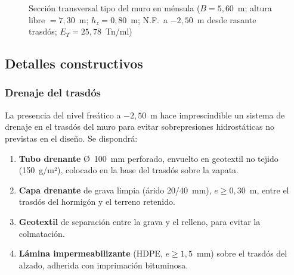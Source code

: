 \begin{figure}[H]
\caption{Sección transversal tipo del muro en ménsula
         ($B = 5{,}60$~m; altura libre $= 7{,}30$~m; $h_z = 0{,}80$~m;
          N.F.\ a $-2{,}50$~m desde rasante trasdós;
          $E_T = 25{,}78$~Tn/ml)}
\label{fig:muro_seccion}
\end{figure}

\subsection{Detalles constructivos}
\label{subsec:detalles_constructivos}

\subsubsection{Drenaje del trasdós}

La presencia del nivel freático a $-2{,}50$~m hace imprescindible un sistema
de drenaje en el trasdós del muro para evitar sobrepresiones hidrostáticas no
previstas en el diseño. Se dispondrá:

\begin{enumerate}
  \item \textbf{Tubo drenante} Ø~100~mm perforado, envuelto en geotextil no
        tejido (150~g/m²), colocado en la base del trasdós sobre la zapata.
  \item \textbf{Capa drenante} de grava limpia (árido 20/40~mm), $e \geq 0{,}30$~m,
        entre el trasdós del hormigón y el terreno retenido.
  \item \textbf{Geotextil} de separación entre la grava y el relleno, para
        evitar la colmatación.
  \item \textbf{Lámina impermeabilizante} (HDPE, $e \geq 1{,}5$~mm) sobre el
        trasdós del alzado, adherida con imprimación bituminosa.
\end{enumerate}

